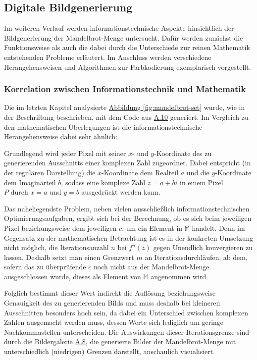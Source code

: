 \subsection{Digitale Bildgenerierung}\label{subsec:digital-generation}

Im weiteren Verlauf werden informationstechnische Aspekte
hinsichtlich der Bildgenerierung der Mandelbrot-Menge untersucht.
Dafür werden zunächst die Funktionsweise als auch die dabei durch die Unterschiede
zur reinen Mathematik entstehenden Probleme erläutert.
Im Anschluss werden verschiedene Herangehensweisen und Algorithmen zur Farbkodierung
exemplarisch vorgestellt.

\subsubsection{Korrelation zwischen Informationstechnik und Mathematik}
\label{subsubsec:correlation-between-it-and-mathematics}

Die im letzten Kapitel analysierte \hyperref[fig:mandelbrot-set]
{Abbildung \ref{fig:mandelbrot-set}} wurde,
wie in der Beschriftung beschrieben, mit dem Code aus \hyperref[app:10]{A.10}
generiert.
Im Vergleich zu den mathematischen Überlegungen ist die
informationstechnische Herangehensweise dabei sehr ähnlich:

Grundlegend wird jeder Pixel mit seiner $x$- und $y$-Koordinate des zu generierenden
Ausschnitts einer komplexen Zahl zugeordnet.
Dabei entspricht (in der regulären Darstellung) die $x$-Koordinate dem Realteil
$a$ und die $y$-Koordinate dem Imaginärteil $b$, sodass eine komplexe Zahl
$z = a + bi$ in einem Pixel $P \text{ durch } x = a \text{ und } y = b$ ausgedrückt
werden kann.

Das naheliegendste Problem, neben vielen ausschließlich informationstechnischen
Optimierungsaufgaben, ergibt sich bei der Berechnung, ob es sich beim jeweiligen Pixel
beziehungsweise dem jeweiligen $c$, um ein Element in
$\mathbb{M}$ handelt.
Denn im Gegensatz zu der mathematischen Betrachtung ist es in der konkreten Umsetzung
nicht möglich, die Iterationsanzahl $n$ bei $f^n(z)$ gegen Unendlich konvergieren zu lassen.
Deshalb setzt man einen Grenzwert $m$ an Iterationsdurchläufen, ab dem,
sofern das zu überprüfende $c$ noch nicht aus der Mandelbrot-Menge
ausgeschlossen wurde, dieses als Element von $\mathbb{M}$ angenommen wird.

Folglich bestimmt dieser Wert indirekt die Auflösung beziehungsweise Genauigkeit
des zu generierenden Bilds und muss deshalb bei kleineren Ausschnitten besonders
hoch sein, da dabei ein Unterschied zwischen komplexen Zahlen ausgemacht werden
muss, dessen Werte sich lediglich um geringe Nachkommastellen unterscheiden.
Die Auswirkungen dieser Iterationsgrenze sind durch die Bildergalerie
\hyperref[app:8]{A.8}, die generierte Bilder der Mandelbrot-Menge
mit unterschiedlich (niedrigen) Grenzen darstellt, anschaulich visualisiert.

